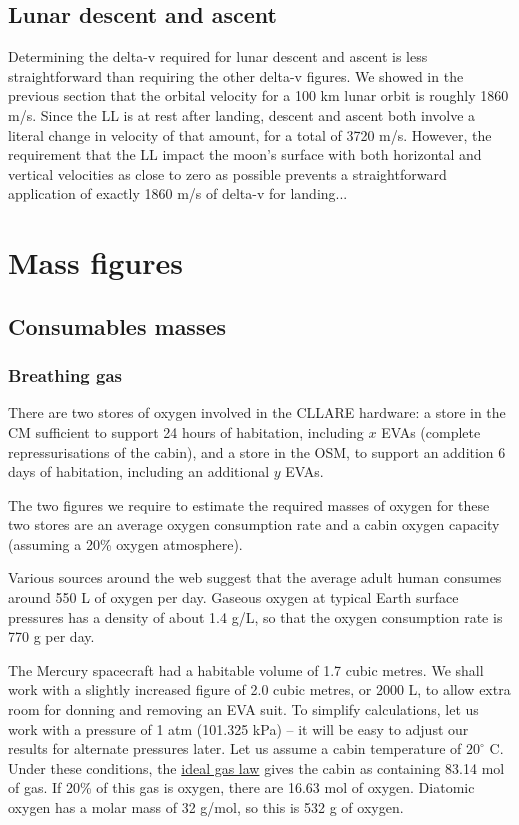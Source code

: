 \documentclass{report}
\begin{document}
\subsection{Lunar descent and ascent}

Determining the delta-v required for lunar descent and ascent is less straightforward than requiring the other delta-v figures.  We showed in the previous section that the orbital velocity for a 100 km lunar orbit is roughly 1860 m/s.  Since the LL is at rest after landing, descent and ascent both involve a literal change in velocity of that amount, for a total of 3720 m/s.  However, the requirement that the LL impact the moon's surface with both horizontal and vertical velocities as close to zero as possible prevents a straightforward application of exactly 1860 m/s of delta-v for landing...

\section{Mass figures}

\subsection{Consumables masses}

\subsubsection{Breathing gas}

There are two stores of oxygen involved in the CLLARE hardware: a store in the CM sufficient to support 24 hours of habitation, including $x$ EVAs (complete repressurisations of the cabin), and a store in the OSM, to support an addition 6 days of habitation, including an additional $y$ EVAs.

The two figures we require to estimate the required masses of oxygen for these two stores are an average oxygen consumption rate and a cabin oxygen capacity (assuming a 20\% oxygen atmosphere).

Various sources around the web suggest that the average adult human consumes around 550 L of oxygen per day.  Gaseous oxygen at typical Earth surface pressures has a density of about 1.4 g/L, so that the oxygen consumption rate is 770 g per day. 

The Mercury spacecraft had a habitable volume of 1.7 cubic metres.  We shall work with a slightly increased figure of 2.0 cubic metres, or 2000 L, to allow extra room for donning and removing an EVA suit.  To simplify calculations, let us work with a pressure of 1 atm (101.325 kPa) -- it will be easy to adjust our results for alternate pressures later.  Let us assume a cabin temperature of $20^\circ$ C.  Under these conditions, the \href{http://en.wikipedia.org/wiki/Ideal_gas_law}{ideal gas law} gives the cabin as containing 83.14 mol of gas.  If 20\% of this gas is oxygen, there are 16.63 mol of oxygen.  Diatomic oxygen has a molar mass of 32 g/mol, so this is 532 g of oxygen.
\end{document}
